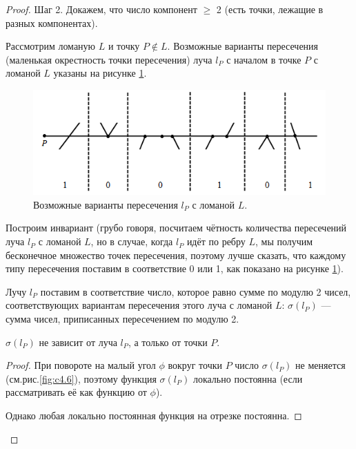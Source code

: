 \begin{proof}
    Шаг 2. Докажем, что число компонент $\geqslant$ 2 (есть точки, лежащие в разных компонентах).

    Рассмотрим ломаную $L$ и точку $P \notin L$. Возможные варианты пересечения (маленькая окрестность точки пересечения) луча $l_P$ с началом в точке $P$ с ломаной $L$ указаны на рисунке \ref{fig:c4.5}.

    \begin{figure}[h]
        \centering
        \includegraphics[scale=0.9]{images/c4.5.png}
        \caption{Возможные варианты пересечения $l_P$ с ломаной $L$.}
        \label{fig:c4.5}
    \end{figure}

    Построим инвариант (грубо говоря, посчитаем чётность количества пересечений луча $l_P$ с ломаной $L$, но в случае, когда $l_P$ идёт по ребру $L$, мы получим бесконечное множество точек пересечения, поэтому лучше сказать, что каждому типу пересечения поставим в соответствие 0 или 1, как показано на рисунке \ref{fig:c4.5}).

    Лучу $l_P$ поставим в соответствие число, которое равно сумме по модулю 2 чисел, соответствующих вариантам пересечения этого луча с ломаной $L$:
    $\sigma(l_P)$ — сумма чисел, приписанных пересечением по модулю 2.

    \begin{statement}
        $\sigma(l_P)$ не зависит от луча $l_P$, а только от точки $P$.
    \end{statement} 
    \begin{proof}
        При повороте на малый угол $\phi$ вокруг точки $P$ число $\sigma(l_P)$ не меняется (см.рис.\ref{fig:c4.6}), поэтому функция $\sigma(l_P)$ локально постоянна (если рассматривать её как функцию от $\phi$).

        Однако любая локально постоянная функция на отрезке постоянна.


\end{proof}
\end{proof}
